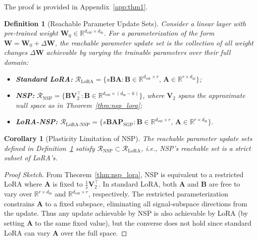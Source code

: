 \documentclass{article}
\newtheorem{corollary}[theorem]{Corollary}
\newtheorem{definition}[theorem]{Definition}
\begin{document}
The proof is provided in Appendix~\ref{app:thm1}.

\begin{definition}[Reachable Parameter Update Sets]
\label{def:reachable}
Consider a linear layer with pre-trained weight $\mathbf{W}_0 \in \mathbb{R}^{d_{\text{out}} \times d_{\text{in}}}$. For a parameterization of the form $\mathbf{W} = \mathbf{W}_0 + \Delta\mathbf{W}$, the \emph{reachable parameter update set} is the collection of all weight changes $\Delta\mathbf{W}$ achievable by varying the trainable parameters over their full domain:
\begin{itemize}
    \item \textbf{Standard LoRA:} $\mathcal{R}_{\text{LoRA}} = \{s\mathbf{B}\mathbf{A} : \mathbf{B} \in \mathbb{R}^{d_{\text{out}} \times r},\, \mathbf{A} \in \mathbb{R}^{r \times d_{\text{in}}}\}$;
    \item \textbf{NSP:} $\mathcal{R}_{\text{NSP}} = \{\mathbf{B}\mathbf{V}_2^\top : \mathbf{B} \in \mathbb{R}^{d_{\text{out}} \times (d_{\text{in}}-k)}\}$, where $\mathbf{V}_2$ spans the approximate null space as in Theorem~\ref{thm:nsp_lora};
    \item \textbf{LoRA-NSP:} $\mathcal{R}_{\text{LoRA-NSP}} = \{s\mathbf{B}\mathbf{A}\mathbf{P}_{\text{SGP}} : \mathbf{B} \in \mathbb{R}^{d_{\text{out}} \times r},\, \mathbf{A} \in \mathbb{R}^{r \times d_{\text{in}}}\}$.
\end{itemize}
\end{definition}

\begin{corollary}[Plasticity Limitation of NSP]
\label{cor:nsp_limit}
The reachable parameter update sets defined in Definition~\ref{def:reachable} satisfy $\mathcal{R}_{\text{NSP}} \subset \mathcal{R}_{\text{LoRA}}$, i.e., NSP's reachable set is a strict subset of LoRA's.
\end{corollary}

\begin{proof}[Proof Sketch]
From Theorem~\ref{thm:nsp_lora}, NSP is equivalent to a restricted LoRA where $\mathbf{A}$ is fixed to $\frac{1}{s}\mathbf{V}_2^\top$. In standard LoRA, both $\mathbf{A}$ and $\mathbf{B}$ are free to vary over $\mathbb{R}^{r \times d_{\text{in}}}$ and $\mathbb{R}^{d_{\text{out}} \times r}$, respectively. The restricted parameterization constrains $\mathbf{A}$ to a fixed subspace, eliminating all signal-subspace directions from the update. Thus any update achievable by NSP is also achievable by LoRA (by setting $\mathbf{A}$ to the same fixed value), but the converse does not hold since standard LoRA can vary $\mathbf{A}$ over the full space.
\end{proof}
\end{document}

